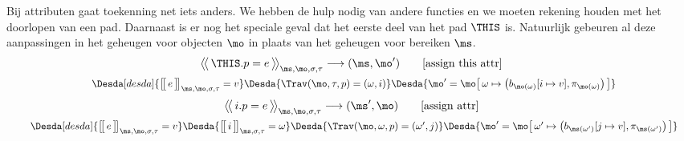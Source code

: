 Bij attributen gaat toekenning net iets anders. We hebben de hulp nodig van andere functies en we moeten rekening houden met het doorlopen van een pad. Daarnaast is er nog het speciale geval dat het eerste deel van het pad $\THIS$ is. Natuurlijk gebeuren al deze aanpassingen in het geheugen voor objecten $\mo$ in plaats van het geheugen voor bereiken $\ms$.
%
\begin{gather*}
  \Config{\THIS.p = e}{\ms, \mo, \sigma, \tau}
  \longrightarrow
  (\ms, \mo')
  \tag*{[assign this attr]} \\
  \Desdas{
    \Desda[desda]{\Express{e}{\ms, \mo, \sigma, \tau} = v}
    \Desda{\Trav(\mo, \tau, p) = (\omega, i)}
    \Desda{\mo'= \mo \surr{ \omega \mapsto \big(b_{\mo(\omega)}[ i \mapsto v ], \pi_{\mo(\omega)}\big) }}
  }
\end{gather*}
%
\begin{gather*}
  \Config{i.p = e}{\ms, \mo, \sigma, \tau}
  \longrightarrow
  (\ms', \mo)
  \tag*{[assign attr]} \\
  \Desdas{
    \Desda[desda]{\Express{e}{\ms, \mo, \sigma, \tau} = v}
    \Desda{\Express{i}{\ms,\sigma,\tau} = \omega}
    \Desda{\Trav(\mo, \omega, p) = (\omega', j)}
    \Desda{\mo'= \mo \surr{ \omega' \mapsto \big(b_{\ms(\omega')}[ j \mapsto v ], \pi_{\ms(\omega')}\big) }}
  }
\end{gather*}

